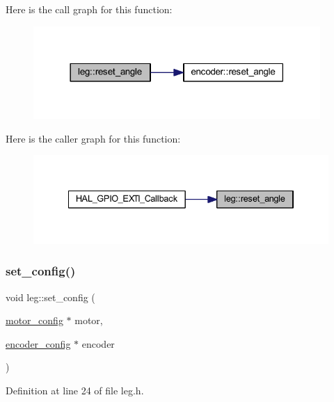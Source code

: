 Here is the call graph for this function\+:
\nopagebreak
\begin{figure}[H]
\begin{center}
\leavevmode
\includegraphics[width=309pt]{classleg_add86097d69f6780c1c651693aac6fa4e_cgraph}
\end{center}
\end{figure}
Here is the caller graph for this function\+:
\nopagebreak
\begin{figure}[H]
\begin{center}
\leavevmode
\includegraphics[width=334pt]{classleg_add86097d69f6780c1c651693aac6fa4e_icgraph}
\end{center}
\end{figure}
\mbox{\label{classleg_aa2d623fc4e7182491a8fdc9d1d21b378}} 
\subsubsection{\texorpdfstring{set\_config()}{set\_config()}}
{\footnotesize\ttfamily void leg\+::set\+\_\+config (\begin{DoxyParamCaption}\item[{\mbox{\hyperlink{structmotor__config}{motor\+\_\+config}} $\ast$}]{motor,  }\item[{\mbox{\hyperlink{structencoder__config}{encoder\+\_\+config}} $\ast$}]{encoder }\end{DoxyParamCaption})\hspace{0.3cm}{\ttfamily [inline]}}



Definition at line 24 of file leg.\+h.

